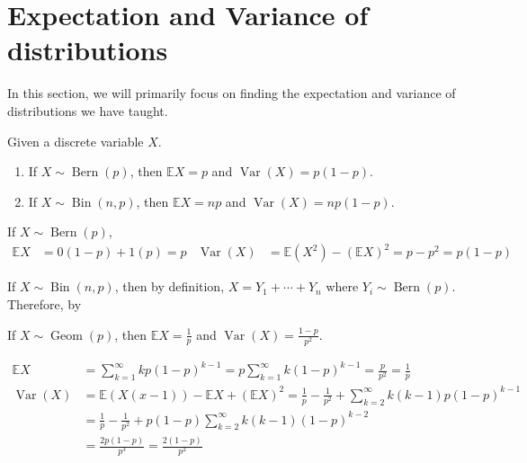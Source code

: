 \documentclass{huhtakm-template-book}
\newcommand{\expect}{\mathbb{E}}
\DeclareMathOperator{\Bern}{Bern}
\DeclareMathOperator{\Bin}{Bin}
\DeclareMathOperator{\Geom}{Geom}
\DeclareMathOperator{\Var}{Var}
\begin{document}
\section{Expectation and Variance of distributions}
In this section, we will primarily focus on finding the expectation and variance of distributions we have taught.
\begin{thm}
	Given a discrete variable $X$.
	\begin{enumerate}
		\item If $X\sim\Bern(p)$, then $\expect{X}=p$ and $\Var(X)=p(1-p)$.
		\item If $X\sim\Bin(n,p)$, then $\expect{X}=np$ and $\Var(X)=np(1-p)$.
	\end{enumerate}
\end{thm}
\begin{proofing}
	\item If $X\sim\Bern(p)$,
	\begin{align*}
		\expect{X}&=0(1-p)+1(p)=p & \Var(X)&=\expect(X^{2})-(\expect{X})^{2}=p-p^{2}=p(1-p)
	\end{align*}
	\item If $X\sim\Bin(n,p)$, then by definition, $X=Y_{1}+\cdots+Y_{n}$ where $Y_{i}\sim\Bern(p)$. Therefore, by 
\end{proofing}
\begin{thm}
	If $X\sim\Geom(p)$, then $\expect{X}=\frac{1}{p}$ and $\Var(X)=\frac{1-p}{p^{2}}$.
\end{thm}
\begin{proofing}
	\begin{align*}
		\expect{X}&=\sum_{k=1}^{\infty}kp(1-p)^{k-1}=p\sum_{k=1}^{\infty}k(1-p)^{k-1}=\frac{p}{p^{2}}=\frac{1}{p}\\
		\Var(X)&=\expect(X(x-1))-\expect{X}+(\expect{X})^{2}=\frac{1}{p}-\frac{1}{p^{2}}+\sum_{k=2}^{\infty}k(k-1)p(1-p)^{k-1}\\
		&=\frac{1}{p}-\frac{1}{p^{2}}+p(1-p)\sum_{k=2}^{\infty}k(k-1)(1-p)^{k-2}\\
		&=\frac{2p(1-p)}{p^{3}}=\frac{2(1-p)}{p^{2}}
	\end{align*}
\end{proofing}
\end{document}
